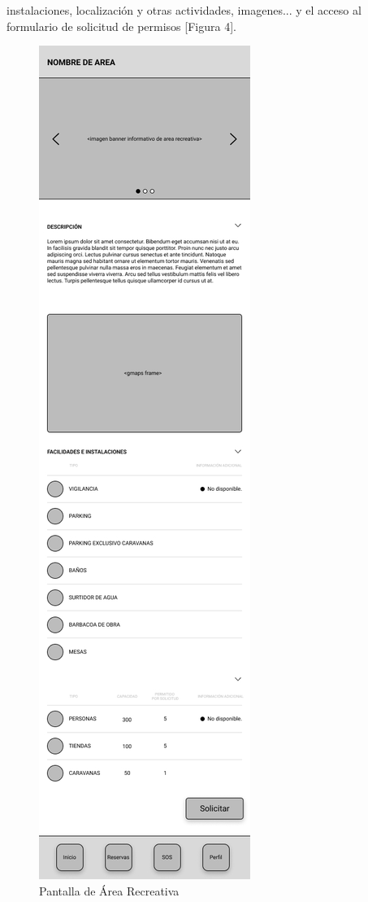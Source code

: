 \documentclass{scrartcl}
\begin{document}
        instalaciones, localización y otras actividades, imagenes... y el acceso al
        formulario de solicitud de permisos [Figura 4].
        \begin{figure}[H]
            \centerline{\includegraphics[scale=0.20]{wirearea}}
            \caption{Pantalla de Área Recreativa}
            \label{fig:wireárea}
        \end{figure}
\end{document}
